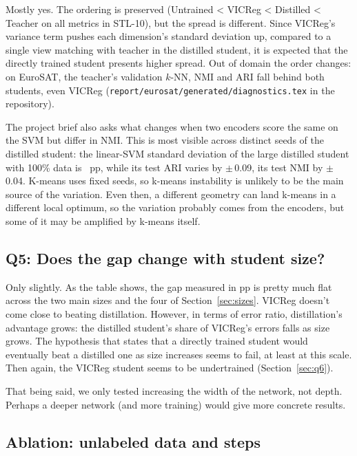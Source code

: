 \documentclass[letterpaper,11pt]{article}
\begin{document}
Mostly yes. The ordering is preserved (Untrained < VICReg < Distilled < Teacher on all metrics in STL-10), but the spread is different. Since VICReg's variance term pushes each dimension's standard deviation up, compared to a single view matching with teacher in the distilled student, it is expected that the directly trained student presents higher spread. Out of domain the order changes: on EuroSAT, the teacher's validation $k$-NN, NMI and ARI fall behind both students, even VICReg (\texttt{report/eurosat/generated/diagnostics.tex} in the repository).

The project brief also asks what changes when two encoders score the same on the SVM but differ in NMI. This is most visible across distinct seeds of the distilled student: the linear-SVM standard deviation of the large distilled student with 100\% data is \AccSdCLFullLinHundred~pp, while its test ARI varies by $\pm$\,0.09, its test NMI by $\pm$\,0.04. K-means uses fixed seeds, so k-means instability is unlikely to be the main source of the variation. Even then, a different geometry can land k-means in a different local optimum, so the variation probably comes from the encoders, but some of it may be amplified by k-means itself. 

\subsection{Q5: Does the gap change with student size?}
\label{sec:q5}

Only slightly. As the table shows, the gap measured in pp is pretty much flat across the two main sizes and the four of Section~\ref{sec:sizes}. VICReg doesn't come close to beating distillation. However, in terms of error ratio, distillation's advantage grows: the distilled student's share of VICReg's errors falls as size grows. The hypothesis that states that a directly trained student would eventually beat a distilled one as size increases seems to fail, at least at this scale. Then again, the VICReg student seems to be undertrained (Section~\ref{sec:q6}).

That being said, we only tested increasing the width of the network, not depth. Perhaps a deeper network (and more training) would give more concrete results.

\subsection{Ablation: unlabeled data and steps}
\label{sec:ablation}
\end{document}
